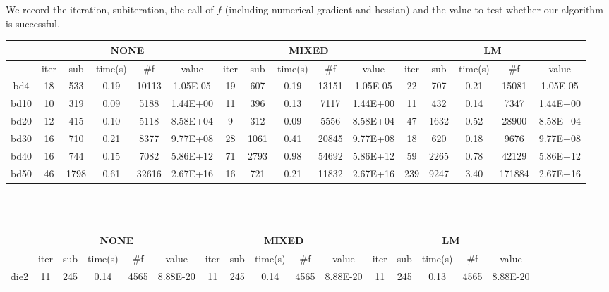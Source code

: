 \documentclass{article}
\begin{document}
We record the iteration, subiteration, the call of $f$ (including numerical gradient and hessian) and the value to test whether our algorithm is successful.
\begin{table}[H]
\footnotesize
	\begin{tabular}{|c|c|c|c|c|c|c|c|c|c|c|c|c|c|c|c|}
		\hline
		& \multicolumn{5}{c|}{NONE}                & \multicolumn{5}{c|}{MIXED}               & \multicolumn{5}{c|}{LM}                   \\ \hline
		& iter & sub  & time(s) & \#f   & value    & iter & sub  & time(s) & \#f   & value    & iter & sub  & time(s) & \#f    & value    \\ \hline
		bd4  & 18   & 533  & 0.19    & 10113 & 1.05E-05 & 19   & 607  & 0.19    & 13151 & 1.05E-05 & 22   & 707  & 0.21    & 15081  & 1.05E-05 \\ \hline
		bd10 & 10   & 319  & 0.09    & 5188  & 1.44E+00 & 11   & 396  & 0.13    & 7117  & 1.44E+00 & 11   & 432  & 0.14    & 7347   & 1.44E+00 \\ \hline
		bd20 & 12   & 415  & 0.10    & 5118  & 8.58E+04 & 9    & 312  & 0.09    & 5556  & 8.58E+04 & 47   & 1632 & 0.52    & 28900  & 8.58E+04 \\ \hline
		bd30 & 16   & 710  & 0.21    & 8377  & 9.77E+08 & 28   & 1061 & 0.41    & 20845 & 9.77E+08 & 18   & 620  & 0.18    & 9676   & 9.77E+08 \\ \hline
		bd40 & 16   & 744  & 0.15    & 7082  & 5.86E+12 & 71   & 2793 & 0.98    & 54692 & 5.86E+12 & 59   & 2265 & 0.78    & 42129  & 5.86E+12 \\ \hline
		bd50 & 46   & 1798 & 0.61    & 32616 & 2.67E+16 & 16   & 721  & 0.21    & 11832 & 2.67E+16 & 239  & 9247 & 3.40    & 171884 & 2.67E+16 \\ \hline
	\end{tabular}
\\
\\
	\begin{tabular}{|c|c|c|c|c|c|c|c|c|c|c|c|c|c|c|c|}
		\hline
		& \multicolumn{5}{c|}{NONE}                 & \multicolumn{5}{c|}{MIXED}               & \multicolumn{5}{c|}{LM}                  \\ \hline
		& iter & sub & time(s)  & \#f    & value    & iter & sub & time(s) & \#f    & value    & iter & sub & time(s) & \#f    & value    \\ \hline
		die2  & 11   & 245 & 0.14& 4565   & 8.88E-20 & 11   & 245 & 0.14    & 4565   & 8.88E-20 & 11   & 245 & 0.13    & 4565   & 8.88E-20 \\ \hline

\end{tabular}
\end{table}
\end{document}
